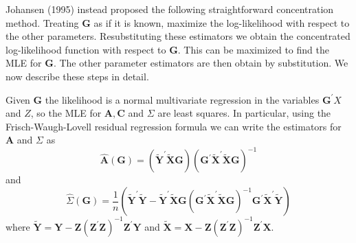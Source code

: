 \documentclass[10pt]{article}
\begin{document}
Johansen (1995) instead proposed the following straightforward concentration method. Treating $\boldsymbol{G}$ as if it is known, maximize the log-likelihood with respect to the other parameters. Resubstituting these estimators we obtain the concentrated log-likelihood function with respect to $\boldsymbol{G}$. This can be maximized to find the MLE for $\boldsymbol{G}$. The other parameter estimators are then obtain by substitution. We now describe these steps in detail.

Given $\boldsymbol{G}$ the likelihood is a normal multivariate regression in the variables $\boldsymbol{G}^{\prime} X$ and $Z$, so the MLE for $\boldsymbol{A}, \boldsymbol{C}$ and $\Sigma$ are least squares. In particular, using the Frisch-Waugh-Lovell residual regression formula we can write the estimators for $\boldsymbol{A}$ and $\Sigma$ as
$$
\widehat{\boldsymbol{A}}(\boldsymbol{G})=\left(\widetilde{\boldsymbol{Y}}^{\prime} \widetilde{\boldsymbol{X}} \boldsymbol{G}\right)\left(\boldsymbol{G}^{\prime} \widetilde{\boldsymbol{X}}^{\prime} \widetilde{\boldsymbol{X}} \boldsymbol{G}\right)^{-1}
$$
and
$$
\widehat{\Sigma}(\boldsymbol{G})=\frac{1}{n}\left(\widetilde{\boldsymbol{Y}}^{\prime} \tilde{\boldsymbol{Y}}-\widetilde{\boldsymbol{Y}}^{\prime} \widetilde{\boldsymbol{X}} \boldsymbol{G}\left(\boldsymbol{G}^{\prime} \widetilde{\boldsymbol{X}}^{\prime} \widetilde{\boldsymbol{X}} \boldsymbol{G}\right)^{-1} \boldsymbol{G}^{\prime} \widetilde{\boldsymbol{X}}^{\prime} \widetilde{\boldsymbol{Y}}\right)
$$
where $\tilde{\boldsymbol{Y}}=\boldsymbol{Y}-\boldsymbol{Z}\left(\boldsymbol{Z}^{\prime} \boldsymbol{Z}\right)^{-1} \boldsymbol{Z}^{\prime} \boldsymbol{Y}$ and $\widetilde{\boldsymbol{X}}=\boldsymbol{X}-\boldsymbol{Z}\left(\boldsymbol{Z}^{\prime} \boldsymbol{Z}\right)^{-1} \boldsymbol{Z}^{\prime} \boldsymbol{X}$.
\end{document}
